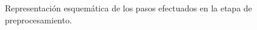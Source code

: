 \label{fig:preprocesamiento} Representación esquemática de los pasos
efectuados en la etapa de preprocesamiento.
